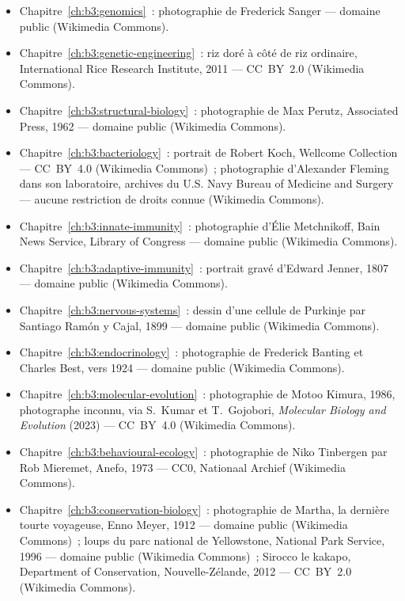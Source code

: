 \begin{itemize}
  \item Chapitre~\ref{ch:b3:genomics}~: photographie de Frederick
        Sanger --- domaine public (Wikimedia Commons).
  \item Chapitre~\ref{ch:b3:genetic-engineering}~: riz doré à côté de
        riz ordinaire, International Rice Research Institute, 2011 ---
        CC~BY~2.0 (Wikimedia Commons).
  \item Chapitre~\ref{ch:b3:structural-biology}~: photographie de Max
        Perutz, Associated Press, 1962 --- domaine public (Wikimedia
        Commons).
  \item Chapitre~\ref{ch:b3:bacteriology}~: portrait de Robert Koch,
        Wellcome Collection --- CC~BY~4.0 (Wikimedia Commons)~;
        photographie d'Alexander Fleming dans son laboratoire, archives
        du U.S. Navy Bureau of Medicine and Surgery --- aucune
        restriction de droits connue (Wikimedia Commons).
  \item Chapitre~\ref{ch:b3:innate-immunity}~: photographie d'Élie
        Metchnikoff, Bain News Service, Library of Congress --- domaine
        public (Wikimedia Commons).
  \item Chapitre~\ref{ch:b3:adaptive-immunity}~: portrait gravé
        d'Edward Jenner, 1807 --- domaine public (Wikimedia Commons).
  \item Chapitre~\ref{ch:b3:nervous-systems}~: dessin d'une cellule de
        Purkinje par Santiago Ramón y Cajal, 1899 --- domaine public
        (Wikimedia Commons).
  \item Chapitre~\ref{ch:b3:endocrinology}~: photographie de Frederick
        Banting et Charles Best, vers 1924 --- domaine public (Wikimedia
        Commons).
  \item Chapitre~\ref{ch:b3:molecular-evolution}~: photographie de Motoo
        Kimura, 1986, photographe inconnu, via S.~Kumar et T.~Gojobori,
        \emph{Molecular Biology and Evolution} (2023) --- CC~BY~4.0
        (Wikimedia Commons).
  \item Chapitre~\ref{ch:b3:behavioural-ecology}~: photographie de Niko
        Tinbergen par Rob Mieremet, Anefo, 1973 --- CC0, Nationaal
        Archief (Wikimedia Commons).
  \item Chapitre~\ref{ch:b3:conservation-biology}~: photographie de
        Martha, la dernière tourte voyageuse, Enno Meyer, 1912 ---
        domaine public (Wikimedia Commons)~; loups du parc national de
        Yellowstone, National Park Service, 1996 --- domaine public
        (Wikimedia Commons)~; Sirocco le kakapo, Department of
        Conservation, Nouvelle-Zélande, 2012 --- CC~BY~2.0 (Wikimedia
        Commons).
\end{itemize}

